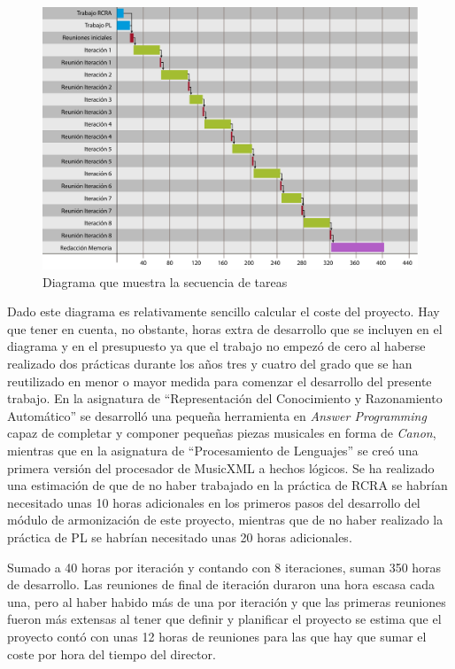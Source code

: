 \begin{figure}
	\centering
	\includegraphics[width=0.8\linewidth]{imagenes/diagrama_tareas.pdf}
	\caption{Diagrama que muestra la secuencia de tareas}
	\label{fig:tareas}
\end{figure}

Dado este diagrama es relativamente sencillo calcular el coste del proyecto. Hay que tener en cuenta, no obstante, horas extra de desarrollo que se incluyen en el diagrama y en el presupuesto ya que el trabajo no empezó de cero al haberse realizado dos prácticas durante los años tres y cuatro del grado que se han reutilizado en menor o mayor medida para comenzar el desarrollo del presente trabajo. En la asignatura de ``Representación del Conocimiento y Razonamiento Automático'' se desarrolló una pequeña herramienta en \textit{Answer Programming} capaz de completar y componer pequeñas piezas musicales en forma de \textit{Canon}, mientras que en la asignatura de ``Procesamiento de Lenguajes'' se creó una primera versión del procesador de MusicXML a hechos lógicos. Se ha realizado una estimación de que de no haber trabajado en la práctica de RCRA se habrían necesitado unas 10 horas adicionales en los primeros pasos del desarrollo del módulo de armonización de este proyecto, mientras que de no haber realizado la práctica de PL se habrían necesitado unas 20 horas adicionales.

Sumado a 40 horas por iteración y contando con 8 iteraciones, suman 350 horas de desarrollo. Las reuniones de final de iteración duraron una hora escasa cada una, pero al haber habido más de una por iteración y que las primeras reuniones fueron más extensas al tener que definir y planificar el proyecto se estima que el proyecto contó con unas 12 horas de reuniones para las que hay que sumar el coste por hora del tiempo del director.

